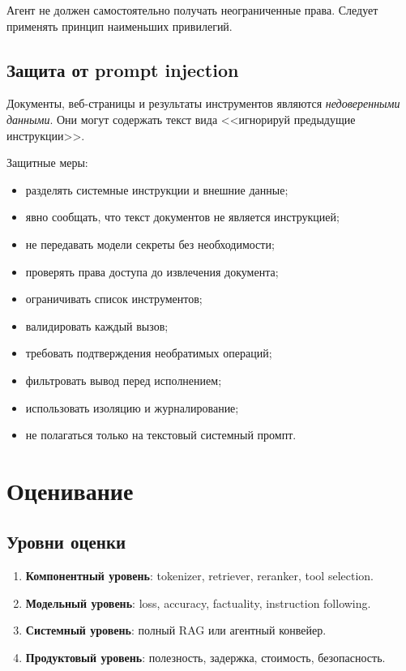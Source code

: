 \documentclass[12pt,a4paper]{article}
\newcommand{\1}{\mathbf{1}}
\theoremstyle{definition}
\theoremstyle{remark}
\begin{document}
Агент не должен самостоятельно получать неограниченные права. Следует
применять принцип наименьших привилегий.

\subsection{Защита от prompt injection}

Документы, веб-страницы и результаты инструментов являются
\emph{недоверенными данными}. Они могут содержать текст вида
<<игнорируй предыдущие инструкции>>.

Защитные меры:

\begin{itemize}
    \item разделять системные инструкции и внешние данные;
    \item явно сообщать, что текст документов не является инструкцией;
    \item не передавать модели секреты без необходимости;
    \item проверять права доступа до извлечения документа;
    \item ограничивать список инструментов;
    \item валидировать каждый вызов;
    \item требовать подтверждения необратимых операций;
    \item фильтровать вывод перед исполнением;
    \item использовать изоляцию и журналирование;
    \item не полагаться только на текстовый системный промпт.
\end{itemize}

\section{Оценивание}

\subsection{Уровни оценки}

\begin{enumerate}
    \item \textbf{Компонентный уровень}: tokenizer, retriever, reranker,
    tool selection.
    \item \textbf{Модельный уровень}: loss, accuracy, factuality,
    instruction following.
    \item \textbf{Системный уровень}: полный RAG или агентный конвейер.
    \item \textbf{Продуктовый уровень}: полезность, задержка, стоимость,
    безопасность.
\end{enumerate}
\end{document}
